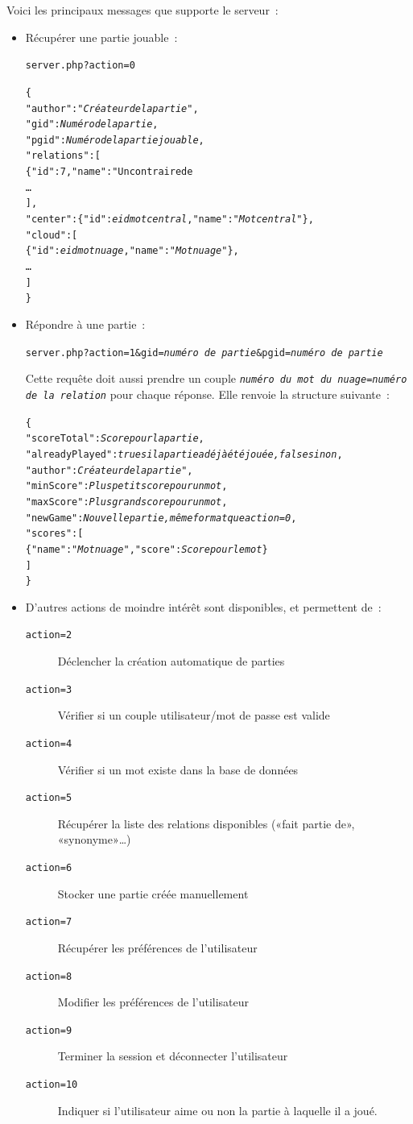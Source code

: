 \documentclass[a4paper,11pt,french]{article}
\begin{document}
Voici les principaux messages que supporte le serveur~:
\begin{itemize}
\item Récupérer une partie jouable~:

\verb!server.php?action=0!
{
\small
\begin{alltt}
\{
\quad"author":"\textit{Créateur de la partie}",
\quad"gid":\textit{Numéro de la partie},
\quad"pgid":\textit{Numéro de la partie jouable},
\quad"relations":[
\quad\quad\{"id":7,"name":"Un contraire de %
\quad\quad…
\quad],
\quad"center":\{"id":\textit{eid mot central},"name":"\textit{Mot central}"\},
\quad"cloud":[
\quad\quad\{"id":\textit{eid mot nuage},"name":"\textit{Mot nuage}"\},
\quad\quad…
\quad]
\}
\end{alltt}
}
\item Répondre à une partie~:

\verb!server.php?action=1&gid=!\textit{\texttt{numéro de partie}}\verb!&pgid=!\textit{\texttt{numéro de partie}}

Cette requête doit aussi prendre un couple \textit{\texttt{numéro du mot du nuage}}\verb!=!\textit{\texttt{numéro de la relation}} pour
chaque réponse. Elle renvoie la structure suivante~:
{
\small
\begin{alltt}
\{
\quad"scoreTotal":\textit{Score pour la partie},
\quad"alreadyPlayed":\textit{true si la partie a déjà été jouée, false sinon},
\quad"author":\textit{Créateur de la partie}",
\quad"minScore":\textit{Plus petit score pour un mot},
\quad"maxScore":\textit{Plus grand score pour un mot},
\quad"newGame":\textit{Nouvelle partie, même format que action=0},
\quad"scores":[
\quad\quad\{"name":"\textit{Mot nuage}", "score":\textit{Score pour le mot}\}
\quad]
\}
\end{alltt}
}

\item D'autres actions de moindre intérêt sont disponibles, et permettent de~:
\begin{description}
\item[\verb!action=2!] Déclencher la création automatique de parties
\item[\verb!action=3!] Vérifier si un couple utilisateur/mot de passe est valide
\item[\verb!action=4!] Vérifier si un mot existe dans la base de données
\item[\verb!action=5!] Récupérer la liste des relations disponibles («fait partie de», «synonyme»…)
\item[\verb!action=6!] Stocker une partie créée manuellement
\item[\verb!action=7!] Récupérer les préférences de l'utilisateur
\item[\verb!action=8!] Modifier les préférences de l'utilisateur
\item[\verb!action=9!] Terminer la session et déconnecter l'utilisateur
\item[\verb!action=10!] Indiquer si l'utilisateur aime ou non la partie à laquelle il a joué.
\end{description}

\end{itemize}
\end{document}
